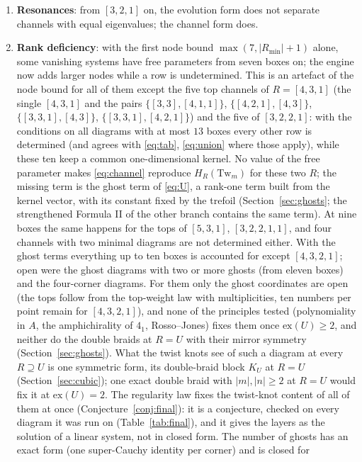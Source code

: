 \documentclass[11pt]{article}
\newcommand{\Tw}{\mathrm{Tw}}
\begin{document}
\begin{enumerate}
$d_X\rho(R)$, and the degree of the polynomial, $|R|-|M_X(R)|$, and above the ghosts it determines the coefficients
through a linear system; a closed formula for the polynomial $K_X(R)$ itself is open.
\item \textbf{Resonances}: from $[3,2,1]$ on, the evolution form does not separate channels with equal eigenvalues;
the channel form does.
\item \textbf{Rank deficiency}: with the first node bound $\max(7,|R_{\min}|+1)$ alone, some vanishing systems have free
parameters from seven boxes on; the engine now adds larger nodes while a row is undetermined.  This is an artefact of
the node bound for all of them except the five top channels of $R=[4,3,1]$
(the single $[4,3,1]$ and the pairs $\{[3,3],[4,1,1]\}$, $\{[4,2,1],[4,3]\}$, $\{[3,3,1],[4,3]\}$, $\{[3,3,1],[4,2,1]\}$)
and the five of $[3,2,2,1]$: with the conditions on all diagrams with at most $13$ boxes every other row is determined
(and agrees with \eqref{eq:tab}, \eqref{eq:union} where those apply), while these ten keep a common one-dimensional
kernel.  No value of the free parameter makes \eqref{eq:channel} reproduce $H_R(\Tw_m)$ for these two $R$; the
missing term is the ghost term of \eqref{eq:U}, a rank-one term built from the kernel vector, with its constant fixed by
the trefoil (Section~\ref{sec:ghosts}; the strengthened Formula II of the other branch contains the same term).  At nine
boxes the same happens for the tops of $[5,3,1]$, $[3,2,2,1,1]$, and four channels with two minimal diagrams are not
determined either.  With the ghost terms everything up to ten boxes is accounted for except $[4,3,2,1]$; open were the
ghost diagrams with two or more ghosts (from eleven boxes) and the four-corner diagrams.  For them only the ghost
coordinates are open (the tops follow from the top-weight law with multiplicities, ten numbers per point remain for
$[4,3,2,1]$), and none of the principles tested (polynomiality in $A$, the amphichirality of $4_1$, Rosso--Jones) fixes
them once $\mathrm{ex}(U)\ge2$, and neither do the double braids at $R=U$ with their mirror symmetry
(Section~\ref{sec:ghosts}).  What the twist knots see of such a diagram at every $R\supseteq U$ is one symmetric form, its
double-braid block $K_U$ at $R=U$ (Section~\ref{sec:cubic}); one exact double braid with $|m|,|n|\ge2$ at $R=U$ would fix
it at $\mathrm{ex}(U)=2$.  The regularity law fixes the twist-knot content of all of them at once
(Conjecture~\ref{conj:final}): it is a conjecture, checked on every diagram it was run on (Table~\ref{tab:final}), and
it gives the layers as the solution of a linear system, not in closed form.  The number of ghosts has an exact form (one super-Cauchy identity per corner) and is closed for

\end{enumerate}
\end{document}
